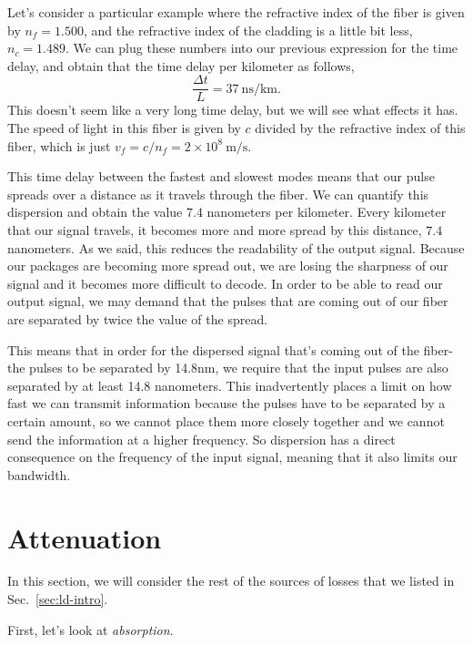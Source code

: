 Let's consider a particular example where the refractive index of the fiber is given by $n_f = 1.500$, and the refractive index of the cladding is a little bit less, $n_c = 1.489$. We can plug these numbers into our previous expression for the time delay, and obtain that the time delay per kilometer as follows,
\begin{equation}
\frac{\Delta t}{L}=37 \mathrm{~ns} / \mathrm{km}.
\end{equation}
This doesn't seem like a very long time delay, but we will see what effects it has. The speed of light in this fiber is given by $c$ divided by the refractive index of this fiber, which is just $v_f=c / n_f=2 \times 10^8 \mathrm{~m} / \mathrm{s}$.

This time delay between the fastest and slowest modes means that our pulse spreads over a distance as it travels through the fiber. We can quantify this dispersion and obtain the value $7.4$ nanometers per kilometer. Every kilometer that our signal travels, it becomes more and more spread by this distance, $7.4$ nanometers. As we said, this reduces the readability of the output signal. Because our packages are becoming more spread out, we are losing the sharpness of our signal and it becomes more difficult to decode. In order to be able to read our output signal, we may demand that the pulses that are coming out of our fiber are separated by twice the value of the spread.

This means that in order for the dispersed signal that's coming out of the fiber- the pulses to be separated by 14.8nm, we require that the input pulses are also separated by at least 14.8 nanometers. This inadvertently places a limit on how fast we can transmit information because the pulses have to be separated by a certain amount, so we cannot place them more closely together and we cannot send the information at a higher frequency. So dispersion has a direct consequence on the frequency of the input signal, meaning that it also limits our bandwidth.



\section{Attenuation}
\label{sec:11-3_attenuation}

In this section, we will consider the rest of the sources of losses that we listed in Sec.~\ref{sec:ld-intro}.

First, let's look at \emph{absorption}.


